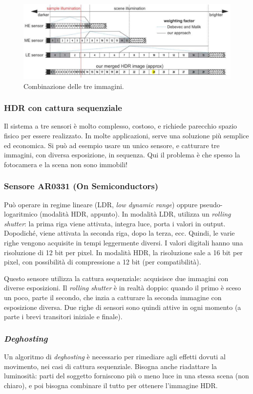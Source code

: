 \documentclass[a4paper,11pt]{article}
\begin{document}
\renewcommand{\thefigure}{3.19}
\begin{figure}[!h]
  \centering
    \includegraphics[scale=0.4]{images/3/combination.png}
    \caption{Combinazione delle tre immagini.}
\end{figure}

\subsubsection{HDR con cattura sequenziale}
Il sistema a tre sensori è molto complesso, costoso, e richiede parecchio spazio fisico per essere realizzato.
In molte applicazioni, serve una soluzione più semplice ed economica. Si può ad esempio usare un unico sensore,
e catturare tre immagini, con diversa esposizione, in sequenza. Qui il problema è che spesso la fotocamera e la scena
non sono immobili!
\subsubsection{Sensore AR0331 (On Semiconductors)}
Può operare in regime lineare (LDR, \textit{low dynamic range}) oppure pseudo-logaritmico (modalità HDR, appunto). In modalità LDR, utilizza un \textit{rolling shutter}:
la prima riga viene attivata, integra luce, porta i valori in output. Dopodiché, viene attivata la seconda riga, dopo la terza, ecc.
Quindi, le varie righe vengono acquisite in tempi leggermente diversi. I valori digitali hanno una risoluzione di 12 bit per pixel.
In modalità HDR, la risoluzione sale a 16 bit per pixel, con possibilità di compressione a 12 bit (per compatibilità).
\par
Questo sensore utilizza la cattura sequenziale: acquisisce due immagini con diverse esposizioni. Il
\textit{rolling shutter} è in realtà doppio: quando il primo è sceso un poco, parte il secondo,
che inzia a catturare la seconda immagine con esposizione diversa. Due righe di sensori sono quindi attive
in ogni momento (a parte i brevi transitori iniziale e finale).

\subsubsection{\textit{Deghosting}}
Un algoritmo di \textit{deghosting} è necessario per rimediare agli effetti dovuti al movimento, nei casi di cattura sequenziale.
Bisogna anche riadattare la luminosità: parti del soggetto forniscono più o meno luce in una stessa scena (non chiaro), e poi bisogna combinare il tutto per ottenere
l'immagine HDR.
\end{document}

